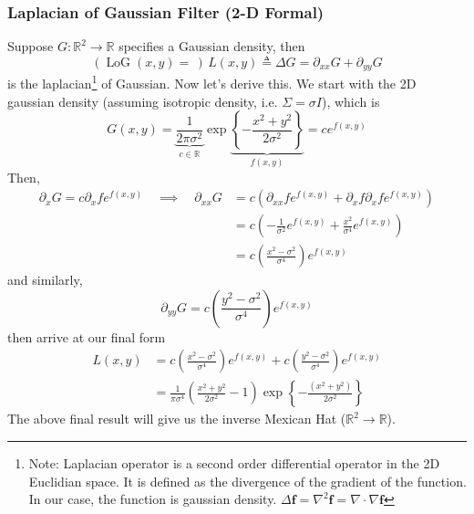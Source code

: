 \documentclass[11pt]{article}
\renewcommand{\bf}{\mathbf{f}}
\newcommand{\real}{\mathbb{R}}
\begin{document}
\subsubsection{Laplacian of Gaussian Filter (2-D Formal)} Suppose $G: \real^2 \rightarrow \real$ specifies a Gaussian density, then 
\begin{equation}
	(\operatorname{LoG}(x,y) = \, ) \, L(x, y) \triangleq \Delta G = \partial_{xx} G + \partial_{yy} G
\end{equation}
is the laplacian\footnote{Note: Laplacian operator is a second order differential operator in the 2D Euclidian space. It is defined as the divergence of the gradient of the function. In our case, the function is gaussian density. $\Delta \bf = \nabla^2 \bf = \nabla \cdot\nabla \bf $} of Gaussian. Now let's derive this. We start with the 2D gaussian density (assuming isotropic density, i.e. $\Sigma = \sigma I$), which is
\begin{equation}
	G(x, y) = \underbrace{\frac{1}{2\pi \sigma^2}}_{c\in \real} \exp \underbrace{\left\{ - \frac{x^2 + y^2 }{2\sigma^2} \right\}}_{f(x,y)} = c e^{f(x,y)}
\end{equation}
Then,
\begin{align}
	\partial_x G = c \partial_x f e^{f(x,y)} \quad \implies \quad \partial_{xx} G &= c\left( \partial_{xx}f e^{f(x, y)} + \partial_x f\partial_x f e^{f(x,y)} \right) \\
	&= c \left( - \frac{1}{\sigma^2} e^{f(x,y)} + \frac{x^2}{\sigma^4} e^{f(x,y)} \right) \\
	&= c \left( \frac{x^2 - \sigma^2}{\sigma^4} \right) e^{f(x, y)}
\end{align}
and similarly, 
\begin{equation}
	\partial_{yy} G = c\left( \frac{y^2 - \sigma^2}{\sigma^4}\right)e^{f(x, y)} 
\end{equation}
then arrive at our final form 
\begin{align}
	L(x, y) 
	&= c \left( \frac{x^2 - \sigma^2}{\sigma^4} \right) e^{f(x, y)} + c\left( \frac{y^2 - \sigma^2}{\sigma^4}\right)e^{f(x, y)} \\
	&= \frac{1}{\pi \sigma^4} \left( \frac{x^2 + y^2}{2\sigma^2} - 1\right) \exp\left\{ - \frac{(x^2 + y^2)}{2\sigma^2} \right\}
\end{align}
The above final result will give us the inverse Mexican Hat ($\real^2 \rightarrow \real$). 
\end{document}
